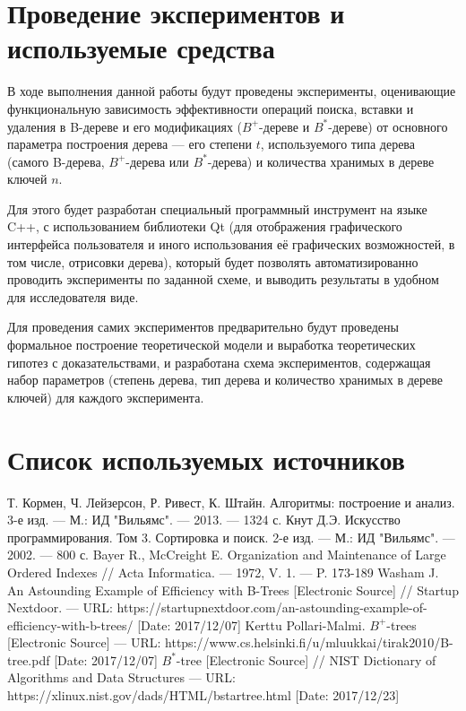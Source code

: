 \documentclass[a4paper,12pt]{article}
\begin{document}
	\section{Проведение экспериментов и используемые средства}
	
	В ходе выполнения данной работы будут проведены эксперименты, оценивающие функциональную зависимость эффективности операций поиска, вставки и удаления в B-дереве и его модификациях ($B^+$-дереве и $B^*$-дереве) от основного параметра построения дерева --- его степени $t$, используемого типа дерева (самого B-дерева, $B^+$-дерева или $B^*$-дерева) и количества хранимых в дереве ключей $n$.
	
	Для этого будет разработан специальный программный инструмент на языке C++, с использованием библиотеки Qt (для отображения графического интерфейса пользователя и иного использования её графических возможностей, в том числе, отрисовки дерева), который будет позволять автоматизированно проводить эксперименты по заданной схеме, и выводить результаты в удобном для исследователя виде.
	
	Для проведения самих экспериментов предварительно будут проведены формальное построение теоретической модели и выработка теоретических гипотез с доказательствами, и разработана схема экспериментов, содержащая набор параметров (степень дерева, тип дерева и количество хранимых в дереве ключей) для каждого эксперимента.
	
	\section{Список используемых источников}
	
	\begingroup
	\renewcommand{\section}[2]{}
	\begin{thebibliography}{}
		Т. Кормен, Ч. Лейзерсон, Р. Ривест, К. Штайн. Алгоритмы: построение и анализ. 3-е изд. --- М.: ИД "Вильямс". --- 2013. --- 1324 с.
		Кнут Д.Э. Искусство программирования. Том 3. Сортировка и поиск. 2-е изд. --- М.: ИД "Вильямс". --- 2002. --- 800 с.
		Bayer R., McCreight E. Organization and Maintenance of Large Ordered Indexes // Acta Informatica. --- 1972, V. 1. --- P. 173-189
		Washam J. An Astounding Example of Efficiency with B-Trees [Electronic Source] // Startup Nextdoor. --- URL: https://startupnextdoor.com/an-astounding-example-of-efficiency-with-b-trees/ [Date: 2017/12/07]
		Kerttu Pollari-Malmi. $B^+$-trees [Electronic Source] --- URL: https://www.cs.helsinki.fi/u/mluukkai/tirak2010/B-tree.pdf [Date: 2017/12/07]
		$B^*$-tree [Electronic Source] // NIST Dictionary of Algorithms and Data Structures --- URL: https://xlinux.nist.gov/dads/HTML/bstartree.html [Date: 2017/12/23]
	\end{thebibliography}
	
\end{document}
